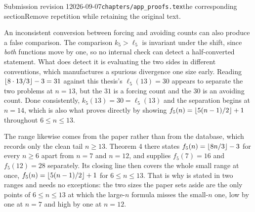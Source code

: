 \begin{offcut}{Submission revision 1}{2026-09-07}{\texttt{chapters/app\_proofs.tex}}{the corresponding section}{Remove repetition while retaining the original text.}
\begin{remark}
An inconsistent conversion between forcing and avoiding counts can also produce a false comparison. The comparison $k_5 > \ell_5$ is invariant under the shift, since \emph{both} functions move by one, so no internal check can detect a half-converted statement. What does detect it is evaluating the two sides in different conventions, which manufactures a spurious divergence one size early. Reading $\left\lfloor 8 \cdot 13/3 \right\rfloor - 3 = 31$ against this thesis's $\ell_5(13) = 30$ appears to separate the two problems at $n = 13$, but the $31$ is a forcing count and the $30$ is an avoiding count. Done consistently, $k_5(13) = 30 = \ell_5(13)$ and the separation begins at $n = 14$, which is also what \cite{SorensenThomassen74} proves directly by showing $f_5(n) = \left\lfloor 5(n-1)/2 \right\rfloor + 1$ throughout $6 \le n \le 13$.

The range likewise comes from the paper rather than from the database, which records only the clean tail $n \ge 13$. Theorem 4 there states $f_5(n) = \left\lfloor 8n/3 \right\rfloor - 3$ for every $n \ge 6$ apart from $n = 7$ and $n = 12$, and supplies $f_5(7) = 16$ and $f_5(12) = 28$ separately. Its closing line then covers the whole small range at once, $f_5(n) = \left\lfloor 5(n-1)/2 \right\rfloor + 1$ for $6 \le n \le 13$. That is why  is stated in two ranges and needs no exceptions: the two sizes the paper sets aside are the only points of $6 \le n \le 13$ at which the large-$n$ formula misses the small-$n$ one, low by one at $n = 7$ and high by one at $n = 12$.
\end{remark}


\end{offcut}

